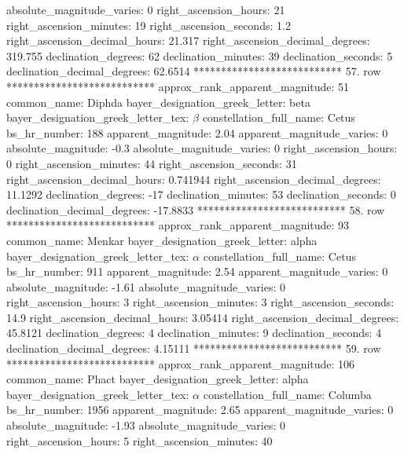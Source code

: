          absolute_magnitude_varies: 0
             right_ascension_hours: 21
           right_ascension_minutes: 19
           right_ascension_seconds: 1.2
     right_ascension_decimal_hours: 21.317
   right_ascension_decimal_degrees: 319.755
               declination_degrees: 62
               declination_minutes: 39
               declination_seconds: 5
       declination_decimal_degrees: 62.6514
*************************** 57. row ***************************
    approx_rank_apparent_magnitude: 51
                       common_name: Diphda
    bayer_designation_greek_letter: beta
bayer_designation_greek_letter_tex: $\beta$
           constellation_full_name: Cetus
                      bs_hr_number: 188
                apparent_magnitude: 2.04
         apparent_magnitude_varies: 0
                absolute_magnitude: -0.3
         absolute_magnitude_varies: 0
             right_ascension_hours: 0
           right_ascension_minutes: 44
           right_ascension_seconds: 31
     right_ascension_decimal_hours: 0.741944
   right_ascension_decimal_degrees: 11.1292
               declination_degrees: -17
               declination_minutes: 53
               declination_seconds: 0
       declination_decimal_degrees: -17.8833
*************************** 58. row ***************************
    approx_rank_apparent_magnitude: 93
                       common_name: Menkar
    bayer_designation_greek_letter: alpha
bayer_designation_greek_letter_tex: $\alpha$
           constellation_full_name: Cetus
                      bs_hr_number: 911
                apparent_magnitude: 2.54
         apparent_magnitude_varies: 0
                absolute_magnitude: -1.61
         absolute_magnitude_varies: 0
             right_ascension_hours: 3
           right_ascension_minutes: 3
           right_ascension_seconds: 14.9
     right_ascension_decimal_hours: 3.05414
   right_ascension_decimal_degrees: 45.8121
               declination_degrees: 4
               declination_minutes: 9
               declination_seconds: 4
       declination_decimal_degrees: 4.15111
*************************** 59. row ***************************
    approx_rank_apparent_magnitude: 106
                       common_name: Phact
    bayer_designation_greek_letter: alpha
bayer_designation_greek_letter_tex: $\alpha$
           constellation_full_name: Columba
                      bs_hr_number: 1956
                apparent_magnitude: 2.65
         apparent_magnitude_varies: 0
                absolute_magnitude: -1.93
         absolute_magnitude_varies: 0
             right_ascension_hours: 5
           right_ascension_minutes: 40
